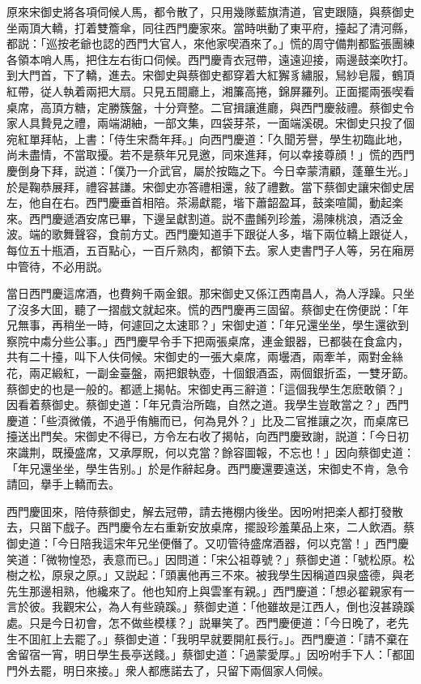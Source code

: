 原來宋御史將各項伺候人馬，都令散了，只用幾隊藍旗清道，官吏跟隨，與蔡御史坐兩頂大轎，打着雙簷傘，同往西門慶家來。當時哄動了東平府，擡起了清河縣，都説：「巡按老爺也認的西門大官人，來他家喫酒來了。」慌的周守備荆都監張團練各領本哨人馬，把住左右街口伺候。西門慶青衣冠帶，遠遠迎接，兩邊鼓楽吹打。到大門首，下了轎，進去。宋御史與蔡御史都穿着大紅獬豸繡服，舃紗皂履，鶴頂紅帶，従人執着兩把大扇。只見五間廳上，湘簾高捲，錦屏羅列。正面擺兩張喫看桌席，高頂方糖，定勝簇盤，十分齊整。二官揖讓進廳，與西門慶敍禮。蔡御史令家人具贄見之禮，兩端湖紬，一部文集，四袋芽茶，一面端溪硯。宋御史只投了個宛紅單拜帖，上書：「侍生宋喬年拜。」向西門慶道：「久聞芳譽，學生初臨此地，尚未盡情，不當取擾。若不是蔡年兄見邀，同來進拜，何以幸接尊顔！」慌的西門慶倒身下拜，説道：「僕乃一介武官，屬於按臨之下。今日幸蒙清顧，蓬蓽生光。」於是鞠恭展拜，禮容甚謙。宋御史亦答禮相還，敍了禮數。當下蔡御史讓宋御史居左，他自在右。西門慶垂首相陪。茶湯獻罷，堦下蕭韶盈耳，鼓楽喧闐，動起楽來。西門慶遞酒安席已畢，下邊呈獻割道。説不盡餚列珍羞，湯陳桃浪，酒泛金波。端的歌舞聲容，食前方丈。西門慶知道手下跟従人多，堦下兩位轎上跟従人，每位五十瓶酒，五百點心，一百斤熟肉，都領下去。家人吏書門子人等，另在廂房中管待，不必用説。

當日西門慶這席酒，也費夠千兩金銀。那宋御史又係江西南昌人，為人浮躁。只坐了沒多大囬，聽了一摺戲文就起來。慌的西門慶再三固留。蔡御史在傍便説：「年兄無事，再稍坐一時，何遽回之太速耶？」宋御史道：「年兄還坐坐，學生還欲到察院中䖏分些公事。」西門慶早令手下把兩張桌席，連金銀器，已都裝在食盒内，共有二十擡，叫下人伕伺候。宋御史的一張大桌席，兩壜酒，兩牽羊，兩對金絲花，兩疋緞紅，一副金臺盤，兩把銀執壺，十個銀酒盃，兩個銀折盃，一雙牙筯。蔡御史的也是一般的。都遞上揭帖。宋御史再三辭道：「這個我學生怎麽敢領？」因看着蔡御史。蔡御史道：「年兄貴治所臨，自然之道。我學生豈敢當之？」西門慶道：「些湏微儀，不過乎侑觴而已，何為見外？」比及二官推讓之次，而桌席已擡送出門矣。宋御史不得已，方令左右收了揭帖，向西門慶致謝，説道：「今日初來識荆，既擾盛席，又承厚貺，何以克當？餘容圖報，不忘也！」因向蔡御史道：「年兄還坐坐，學生告别。」於是作辭起身。西門慶還要遠送，宋御史不肯，急令請回，擧手上轎而去。

西門慶囬來，陪侍蔡御史，解去冠帶，請去捲棚内後坐。因吩咐把楽人都打發散去，只㽞下戲子。西門慶令左右重新安放桌席，擺設珍羞菓品上來，二人飲酒。蔡御史道：「今日陪我這宋年兄坐便僭了。又叨管待盛席酒器，何以克當！」西門慶笑道：「微物惶恐，表意而已。」因問道：「宋公祖尊號？」蔡御史道：「號松原。松樹之松，原泉之原。」又説起：「頭裏他再三不來。被我學生因稱道四泉盛德，與老先生那邊相熟，他纔來了。他也知府上與雲峯有親。」西門慶道：「想必翟親家有一言於彼。我觀宋公，為人有些蹺蹊。」蔡御史道：「他雖故是江西人，倒也沒甚蹺蹊處。只是今日初會，怎不做些模樣？」説畢笑了。西門慶便道：「今日晚了，老先生不囬舡上去罷了。」蔡御史道：「我明早就要開舡長行。」。西門慶道：「請不棄在舍留宿一宵，明日學生長亭送餞。」蔡御史道：「過蒙愛厚。」因吩咐手下人：「都囬門外去罷，明日來接。」衆人都應諾去了，只留下兩個家人伺候。

